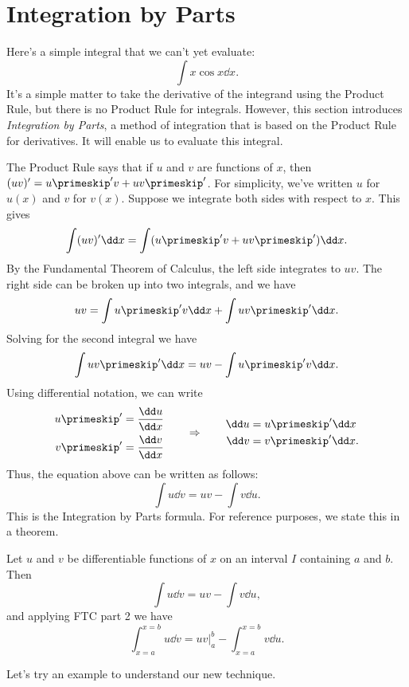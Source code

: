\section{Integration by Parts}\label{sec:IBP}

Here's a simple integral that we can't yet evaluate:
\[\int x\cos x\dd x.\]
It's a simple matter to take the derivative of the integrand using the Product Rule, but there is no Product Rule for integrals.  However, this section introduces \emph{Integration by Parts}, a method of integration that is based on the Product Rule for derivatives. It will enable us to evaluate this integral.

The Product Rule says that if $u$ and $v$ are functions of $x$, then  $(uv)' = u\primeskip'v + uv\primeskip'$.  For simplicity, we've written $u$ for $u(x)$ and $v$ for $v(x)$.  Suppose we integrate both sides with respect to $x$.  This gives
\[\int (uv)'\dd x = \int (u\primeskip'v+uv\primeskip')\dd x.\]
By the Fundamental Theorem of Calculus, the left side integrates to $uv$.  The right side can be broken up into two integrals, and we have
\[uv = \int u\primeskip'v\dd x + \int uv\primeskip'\dd x.\]
Solving for the second integral we have
\[\int uv\primeskip'\dd x = uv - \int u\primeskip'v\dd x.\]
Using differential notation, we can write
\[
\begin{aligned}
 u\primeskip'&=\frac{\dd u}{\dd x} \\
 v\primeskip'&=\frac{\dd v}{\dd x}
\end{aligned}
\qquad\Rightarrow\qquad
\begin{aligned}
 \dd u&=u\primeskip'\dd x \\
 \dd v&=v\primeskip'\dd x.
\end{aligned}
\]
Thus, the equation above can be written as follows:
\[\int u\dd v = uv - \int v\dd u.\]
This is the Integration by Parts formula. For reference purposes, we state this in a theorem.

\begin{theorem}\label{thm:IBP}
Let $u$ and $v$ be differentiable functions of $x$ on an interval $I$ containing $a$ and $b$. Then 
\[\int u\dd v = uv - \int v\dd u,\]
and applying FTC part 2 we have 
\[\int_{x=a}^{x=b} u\dd v = uv\Big|_a^b - \int_{x=a}^{x=b}v\dd u.\]
\end{theorem}


Let's try an example to understand our new technique.

